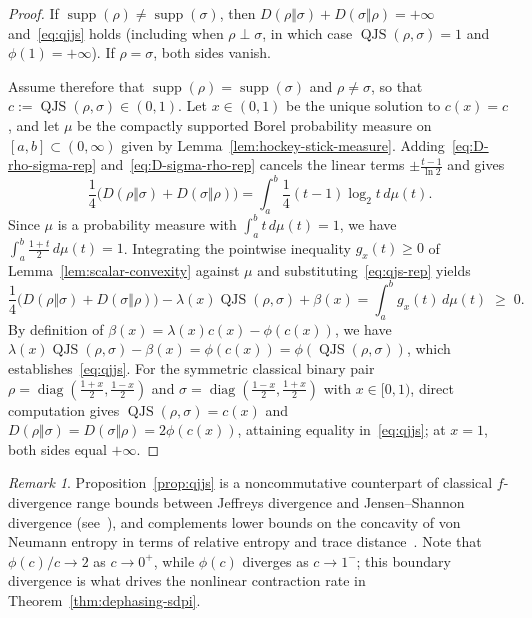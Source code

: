 \documentclass[10pt,a4paper]{article}
\numberwithin{equation}{section}
\theoremstyle{plain}
\theoremstyle{definition}
\theoremstyle{remark}
\newtheorem*{remark}{Remark}
\DeclareMathOperator{\supp}{supp}
\DeclareMathOperator{\diag}{diag}
\DeclareMathOperator{\QJS}{QJS}
\begin{document}
\begin{proof}
If $\supp(\rho) \ne \supp(\sigma)$, then $D(\rho \Vert \sigma) + D(\sigma \Vert \rho) = +\infty$ and~\eqref{eq:qjjs} holds (including when $\rho \perp \sigma$, in which case $\QJS(\rho, \sigma) = 1$ and $\phi(1) = +\infty$). If $\rho = \sigma$, both sides vanish.

Assume therefore that $\supp(\rho) = \supp(\sigma)$ and $\rho \ne \sigma$, so that $c := \QJS(\rho, \sigma) \in (0,1)$. Let $x \in (0,1)$ be the unique solution to $c(x) = c$, and let $\mu$ be the compactly supported Borel probability measure on $[a,b] \subset (0,\infty)$ given by Lemma~\ref{lem:hockey-stick-measure}. Adding~\eqref{eq:D-rho-sigma-rep} and~\eqref{eq:D-sigma-rho-rep} cancels the linear terms $\pm\frac{t-1}{\ln 2}$ and gives
\[
\frac{1}{4}\bigl(D(\rho \Vert \sigma) + D(\sigma \Vert \rho)\bigr) = \int_a^b \frac{1}{4}(t - 1)\log_2 t\, d\mu(t).
\]
Since $\mu$ is a probability measure with $\int_a^b t\, d\mu(t) = 1$, we have $\int_a^b \frac{1+t}{2}\, d\mu(t) = 1$. Integrating the pointwise inequality $g_x(t) \ge 0$ of Lemma~\ref{lem:scalar-convexity} against $\mu$ and substituting~\eqref{eq:qjs-rep} yields
\[
\frac{1}{4}\bigl(D(\rho \Vert \sigma) + D(\sigma \Vert \rho)\bigr) - \lambda(x)\QJS(\rho, \sigma) + \beta(x) = \int_a^b g_x(t)\, d\mu(t) \;\ge\; 0.
\]
By definition of $\beta(x) = \lambda(x)c(x) - \phi(c(x))$, we have $\lambda(x)\QJS(\rho, \sigma) - \beta(x) = \phi(c(x)) = \phi(\QJS(\rho, \sigma))$, which establishes~\eqref{eq:qjjs}. For the symmetric classical binary pair $\rho = \diag(\frac{1+x}{2}, \frac{1-x}{2})$ and $\sigma = \diag(\frac{1-x}{2}, \frac{1+x}{2})$ with $x \in [0,1)$, direct computation gives $\QJS(\rho, \sigma) = c(x)$ and $D(\rho \Vert \sigma) = D(\sigma \Vert \rho) = 2\phi(c(x))$, attaining equality in~\eqref{eq:qjjs}; at $x = 1$, both sides equal $+\infty$.
\end{proof}

\begin{remark}
Proposition~\ref{prop:qjjs} is a noncommutative counterpart of classical $f$-divergence range bounds between Jeffreys divergence and Jensen--Shannon divergence (see~\cite{SasonVerdu2016}), and complements lower bounds on the concavity of von Neumann entropy in terms of relative entropy and trace distance~\cite{KimRuskai2014,MullerHermesFrancaWolf2016}. Note that $\phi(c)/c \to 2$ as $c \to 0^+$, while $\phi(c)$ diverges as $c \to 1^-$; this boundary divergence is what drives the nonlinear contraction rate in Theorem~\ref{thm:dephasing-sdpi}.
\end{remark}
\end{document}
